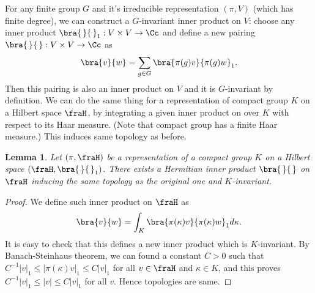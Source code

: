 \documentclass{article}
\newtheorem{lemma}{Lemma}[section]
\begin{document}
For any finite group $G$ and it's irreducible representation $(\pi, V)$ (which has finite degree), we can construct a $G$-invariant inner product on $V$: choose any inner product  $\bra{\,}{\,}_{1}:V\times V\to \Cc$ and define a new pairing $\bra{\,}{\,}:V\times V \to \Cc$ as 
$$
\bra{v}{w} = \sum_{g\in G} \bra{\pi(g)v}{\pi(g)w}_{1}.
$$
Then this pairing is also an inner product on $V$ and it is $G$-invariant by definition. We can do the same thing for a representation of compact group $K$ on a Hilbert space $\fraH$,  by integrating a given inner product on over $K$ with respect to its Haar measure. (Note that compact group has a finite Haar measure.) This induces same topology as before. 
\begin{lemma}
Let $(\pi, \fraH)$ be a representation of a compact group $K$ on a Hilbert space $(\fraH, \bra{\,}{\,}_{1})$. 
There exists a Hermitian inner product $\bra{\,}{\,}$ on $\fraH$ inducing the same topology as the original one and $K$-invariant. 
\end{lemma}
\begin{proof}
We define such inner product on $\fraH$ as 
$$
\bra{v}{w} = \int_{K} \bra{\pi(\kappa)v}{\pi(\kappa)w}_{1}d\kappa. 
$$
It is easy to check that this defines a new inner product which is $K$-invariant. By Banach-Steinhaus theorem,  we can found a constant $C>0$ such that $C^{-1}|v|_{1} \leq |\pi(\kappa)v|_{1} \leq C|v|_{1}$ for all $v\in \fraH$ and $\kappa \in K$, and this proves $C^{-1}|v|_{1} \leq |v| \leq C|v|_{1}$ for all $v$. Hence topologies are same. 
\end{proof}
\end{document}
